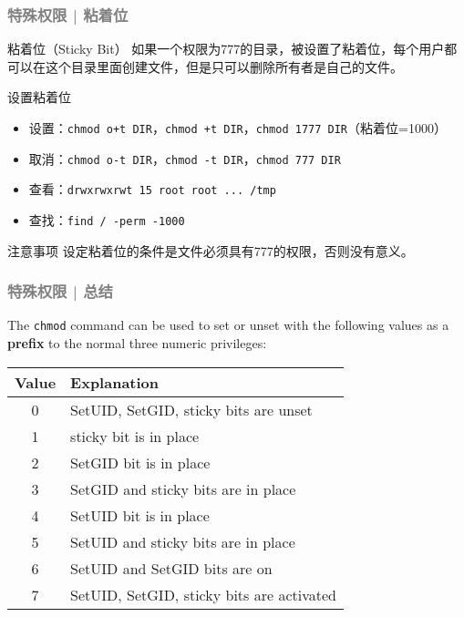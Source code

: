 \begin{frame}[fragile]
  \frametitle{\textcolor{gray}{特殊权限 | 粘着位}}
  \begin{block}{粘着位（Sticky Bit）}
    如果一个权限为777的目录，被设置了粘着位，每个用户都可以在这个目录里面创建文件，但是只可以删除所有者是自己的文件。
  \end{block}
  \pause
  \begin{block}{设置粘着位}
    \begin{itemize}
      \item 设置：\verb|chmod o+t DIR|，\verb|chmod +t DIR|，\verb|chmod 1777 DIR|（粘着位=1000）
      \item 取消：\verb|chmod o-t DIR|，\verb|chmod -t DIR|，\verb|chmod 777 DIR|
      \item 查看：\verb|drwxrwxrwt 15 root root ... /tmp|
      \item 查找：\verb|find / -perm -1000|
    \end{itemize}
  \end{block}
  \pause
  \begin{block}{注意事项}
    设定粘着位的条件是文件必须具有777的权限，否则没有意义。
  \end{block}
\end{frame}

\begin{frame}[fragile]
  \frametitle{\textcolor{gray}{特殊权限 | 总结}}
  The \verb|chmod| command can be used to set or unset with the following values as a \textbf{prefix} to the normal three numeric privileges:
  \begin{table}
    \centering
    \begin{tabular}{cl}
      \hline
      \rowcolor{blue!50}Value & Explanation\\
      \hline
      0 & SetUID, SetGID, sticky bits are unset\\
      1 & sticky bit is in place\\
      2 & SetGID bit is in place\\ 
      3 & SetGID and sticky bits are in place\\
      4 & SetUID bit is in place\\
      5 & SetUID and sticky bits are in place\\
      6 & SetUID and SetGID bits are on\\
      7 & SetUID, SetGID, sticky bits are activated\\
      \hline
    \end{tabular}
  \end{table}
\end{frame}

